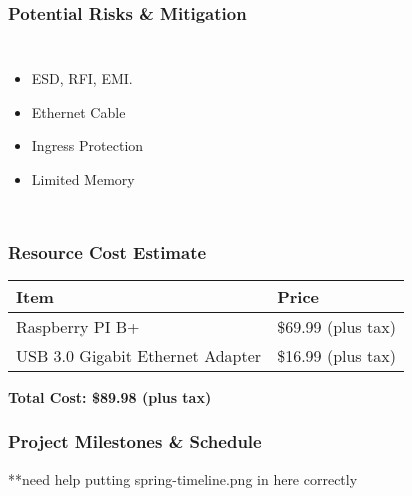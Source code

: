 \begin{frame}
\frametitle{Potential Risks \& Mitigation}

\begin{columns}[c] %

\begin{itemize}
\item ESD, RFI, EMI.
\item Ethernet Cable
\item Ingress Protection
\item Limited Memory
\end{itemize}

\end{columns}
\end{frame}

\begin{frame}
\frametitle{Resource Cost Estimate}

\begin{center}

\begin{tabular}{l | l}
\toprule
\textbf{Item} & \textbf{Price} \\
\midrule
Raspberry PI B+ & \$69.99 (plus tax) \\
USB 3.0 Gigabit Ethernet Adapter & \$16.99 (plus tax) \\
\bottomrule
\end{tabular}

\hfill \break
\textbf{Total Cost: \$89.98 (plus tax)}
\end{center}


\end{frame}

\begin{frame}
\frametitle{Project Milestones \& Schedule}

**need help putting spring-timeline.png in here correctly

\end{frame}
